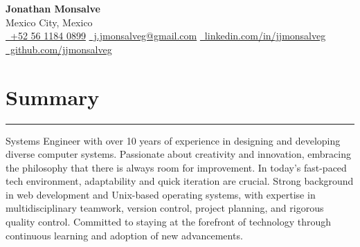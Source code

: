 \documentclass[a4paper,10pt]{article}
\begin{document}
\begin{center}
    {\LARGE \textbf{Jonathan Monsalve}} \\[0.5em]
    Mexico City, Mexico \\[0.75em]
    \href{tel:+525611840899}{\faPhone\ +52 56 1184 0899} \hspace{1em}
    \href{mailto:j.jmonsalveg@gmail.com}{\faEnvelope\ j.jmonsalveg@gmail.com} \hspace{1em}
    \href{https://www.linkedin.com/in/jjmonsalveg/}{\faLinkedin\ linkedin.com/in/jjmonsalveg} \\[0.5em]
    \href{https://github.com/jjmonsalveg}{\faGithub\ github.com/jjmonsalveg}
\end{center}

\vspace{0.5em}

\newcommand{\sectionline}{
	\noindent\rule{\linewidth}{0.4pt}\vspace{0.1em}
}

\section*{Summary}
\sectionline
Systems Engineer with over 10 years of experience in
designing and developing diverse computer systems. Passionate about creativity
and innovation, embracing the philosophy that there is always room for
improvement. In today's fast-paced tech environment, adaptability and quick
iteration are crucial. Strong background in web development and Unix-based
operating systems, with expertise in multidisciplinary teamwork, version
control, project planning, and rigorous quality control. Committed to staying
at the forefront of technology through continuous learning and adoption of
new advancements.

\end{document}
